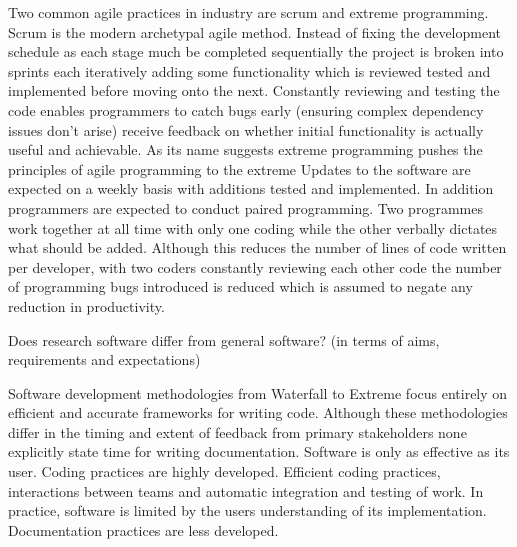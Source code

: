 \documentclass{SBCbookchapter}
\begin{document}
Two common agile practices in industry are scrum and extreme programming.
Scrum is the modern archetypal agile method.
Instead of fixing the development schedule as each stage much be completed sequentially the project is broken into sprints each iteratively adding some functionality which is reviewed tested and implemented before moving onto the next.
Constantly reviewing and testing the code enables programmers to catch bugs early (ensuring complex dependency issues don't arise) receive feedback on whether initial functionality is actually useful and achievable.
As its name suggests extreme programming pushes the principles of agile programming to the extreme
Updates to the software are expected on a weekly basis with additions tested and implemented. 
In addition programmers are expected to conduct paired programming. 
Two programmes work together at all time with only one coding while the other verbally dictates what should be added. 
Although this reduces the number of lines of code written per developer, with two coders constantly reviewing each other code the number of programming bugs introduced is reduced which is assumed to negate any reduction in productivity.

Does research software differ from general software? (in terms of aims, requirements and expectations)

Software development methodologies from Waterfall to Extreme focus entirely on efficient and accurate frameworks for writing code. 
Although these methodologies differ in the timing and extent of feedback from primary stakeholders none explicitly state time for writing documentation. 
Software is only as effective as its user.
Coding practices are highly developed. Efficient coding practices, interactions between teams and automatic integration and testing of work. In practice, software is limited by the users understanding of its implementation.
Documentation practices are less developed.




\end{document}
